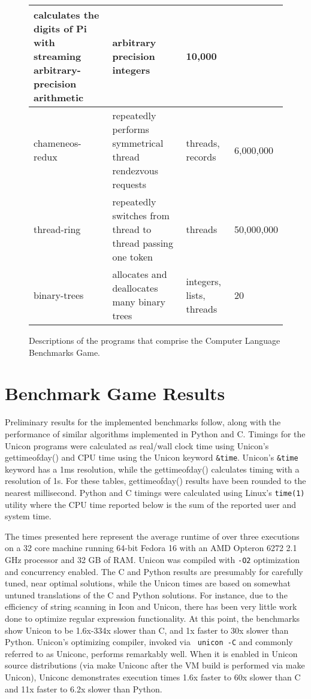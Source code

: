 \documentclass[letterpaper,12pt]{article}
\newcommand{\squeezeup}{\vspace{-1em}}
\begin{document}
\begin{figure}[h]
\begin{center}
{\begin{tabular}{ | p{1.6cm} | p{6.6cm} | p{3.2cm} | p{1.4cm} |}
        calculates the digits of Pi with streaming arbitrary-precision arithmetic & 
        arbitrary precision integers &   
        10,000
        \\ \hline
        chameneos-redux & 
        repeatedly performs symmetrical thread rendezvous requests & 
        threads, records &   
        6,000,000
        \\ \hline
        thread-ring & 
        repeatedly switches from thread to thread passing one token & 
        threads &   
        50,000,000
        \\ \hline
        binary-trees & 
        allocates and deallocates many binary trees & 
        integers, lists, threads &  
        20
        \\ \hline
      \end{tabular}
    }
    \squeezeup
  \end{center}
  \caption{Descriptions of the programs that comprise the Computer
    Language Benchmarks Game.}
  \label{fig}
  \squeezeup
\end{figure}

\section{Benchmark Game Results}

Preliminary results for the implemented benchmarks follow, along with
the performance of similar algorithms implemented in Python and
C. Timings for the Unicon programs were calculated as real/wall clock
time using Unicon's gettimeofday() and CPU time using the Unicon
keyword {\tt \&time}. Unicon's {\tt \&time} keyword has a 1ms resolution,
while the gettimeofday() calculates timing with a resolution of
1{\textmu}s. For these tables, gettimeofday() results have been rounded to
the nearest millisecond. Python and C timings were calculated using
Linux's \texttt{time(1)} utility where the CPU time reported below is
the sum of the reported user and system time.

The times presented here represent the average runtime of over three
executions on a 32 core machine running 64-bit Fedora 16 with an AMD
Opteron 6272 2.1 GHz processor and 32 GB of RAM. Unicon was compiled
with {\tt-O2} optimization and concurrency enabled. The C and Python
results are presumably for carefully tuned, near optimal solutions,
while the Unicon times are based on somewhat untuned translations of
the C and Python solutions. For instance, due to the efficiency of
string scanning in Icon and Unicon, there has been very little work
done to optimize regular expression functionality. At this point, the
benchmarks show Unicon to be 1.6x-334x slower than C, and 1x faster to
30x slower than Python. Unicon's optimizing compiler, invoked via {\tt
  unicon -C} and commonly referred to as Uniconc, performs remarkably
well. When it is enabled in Unicon source distributions (via make
Uniconc after the VM build is performed via make Unicon), Uniconc
demonstrates execution times 1.6x faster to 60x slower than C and 11x
faster to 6.2x slower than Python.
\end{document}

